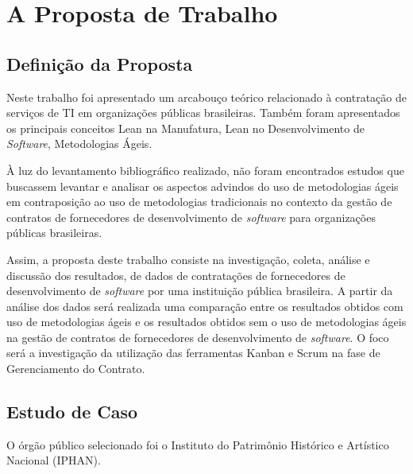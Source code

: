 \chapter[A Proposta de Trabalho]{A Proposta de Trabalho}

\section[Definição da Proposta]{Definição da Proposta}

Neste trabalho foi apresentado um arcabouço teórico relacionado à contratação de serviços de TI em organizações públicas brasileiras. Também foram apresentados os principais conceitos Lean na Manufatura, Lean no Desenvolvimento de \textit{Software}, Metodologias Ágeis.

À luz do levantamento bibliográfico realizado, não foram encontrados estudos que buscassem levantar e analisar os aspectos advindos do uso de metodologias ágeis em contraposição ao uso de metodologias tradicionais no contexto da gestão de contratos de fornecedores de desenvolvimento de \textit{software} para organizações públicas brasileiras.

Assim, a proposta deste trabalho consiste na investigação, coleta, análise e discussão dos resultados, de dados de contratações de fornecedores de desenvolvimento de \textit{software} por uma instituição pública brasileira. A partir da análise  dos dados será realizada uma comparação entre os resultados obtidos com uso de metodologias ágeis e os resultados obtidos sem o uso de metodologias ágeis na gestão de contratos de fornecedores de desenvolvimento de \textit{software}. O foco será a investigação da utilização das ferramentas Kanban e Scrum na fase de Gerenciamento do Contrato.


\section[Estudo de Caso]{Estudo de Caso}

O órgão público selecionado foi o Instituto do Patrimônio Histórico e Artístico Nacional (IPHAN).


